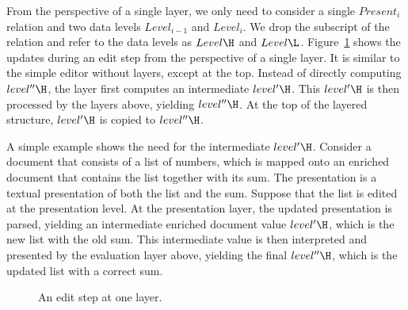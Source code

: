 From the perspective of a single layer, we only need to consider a single $Present_i$ relation and two data levels $Level_{i-1}$ and $Level_{i}$. We drop the subscript of the relation and refer to the data levels as $Level\H$ and $Level\L$. Figure~\ref{layerEditProcess} shows the updates during an edit step from the perspective of a single layer. It is similar to the simple editor without layers, except at the top. Instead of directly computing $level''\H$, the layer first computes an intermediate $level'\H$. This $level'\H$ is then processed by the layers above, yielding $level''\H$. At the top of the layered structure, $level'\H$ is copied to $level''\H$. 




A simple example shows the need for the intermediate $level'\H$. Consider a document that consists of a list of numbers, which is mapped onto an enriched document that contains the list together with its sum. The presentation is a textual presentation of both the list and the sum. Suppose that the list is edited at the presentation level. At the presentation layer, the updated presentation is parsed, yielding an intermediate enriched document value $level'\H$, which is the new list with the old sum. This intermediate value is then interpreted and presented by the evaluation layer above, yielding the final $level''\H$, which is the updated list with a correct sum.

\begin{figure}
\begin{small}
\begin{center}
\begin{center}
\end{center}\caption{An edit step at one layer.}\label{layerEditProcess} 
\end{center}
\end{small}
\end{figure}

